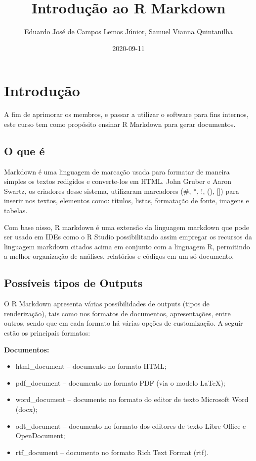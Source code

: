 \documentclass[
]{book}
\title{Introdução ao R Markdown}
\author{Eduardo José de Campos Lemos Júnior, Samuel Vianna Quintanilha}
\date{2020-09-11}
\providecommand{\tightlist}{%
  \setlength{\itemsep}{0pt}\setlength{\parskip}{0pt}}
\begin{document}
\maketitle

{
\setcounter{tocdepth}{1}
\tableofcontents
}
\hypertarget{intro}{%
\chapter{Introdução}\label{intro}}

A fim de aprimorar os membros, e passar a utilizar o software para fins internos, este curso tem como propósito ensinar R Markdown para gerar documentos.

\hypertarget{o-que-uxe9}{%
\section{O que é}\label{o-que-uxe9}}

Markdown é uma linguagem de marcação usada para formatar de maneira simples os textos redigidos e converte-los em HTML. John Gruber e Aaron Swartz, os criadores desse sistema, utilizaram marcadores (\#, *, !, (), {[}{]}) para inserir nos textos, elementos como: títulos, listas, formatação de fonte, imagens e tabelas.

Com base nisso, R markdown é uma extensão da linguagem markdown que pode ser usado em IDEs como o R Studio possibilitando assim empregar os recursos da linguagem markdown citados acima em conjunto com a linguagem R, permitindo a melhor organização de análises, relatórios e códigos em um só documento.

\hypertarget{possuxedveis-tipos-de-outputs}{%
\section{Possíveis tipos de Outputs}\label{possuxedveis-tipos-de-outputs}}

O R Markdown apresenta várias possibilidades de outputs (tipos de renderização), tais como nos formatos de documentos, apresentações, entre outros, sendo que em cada formato há várias opções de customização. A seguir estão os principais formatos:

\textbf{Documentos:}

\begin{itemize}
\tightlist
\item
  html\_document -- documento no formato HTML;
\item
  pdf\_document -- documento no formato PDF (via o modelo LaTeX);
\item
  word\_document -- documento no formato do editor de texto Microsoft Word (docx);
\item
  odt\_document -- documento no formato dos editores de texto Libre Office e OpenDocument;
\item
  rtf\_document -- documento no formato Rich Text Format (rtf).
\end{itemize}
\end{document}
